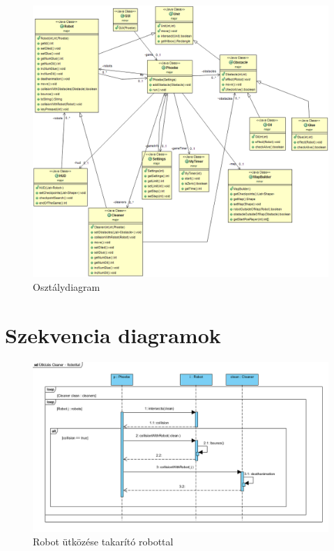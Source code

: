 \begin{figure}[h]
\begin{center}
\includegraphics[width=17cm]{images/struktdiagram.PNG}
\caption{Osztálydiagram}
\label{fig:example3}
\end{center}
\end{figure}
\pagebreak

\section{Szekvencia diagramok}

\begin{figure}[h]
\begin{center}
\includegraphics[width=17cm]{images/Szekvencia_diagrammok/collisionCleanerWithRobot()_sequence.PNG}
\caption{Robot ütközése takarító robottal}
\label{fig:example3}
\end{center}
\end{figure}
\pagebreak

